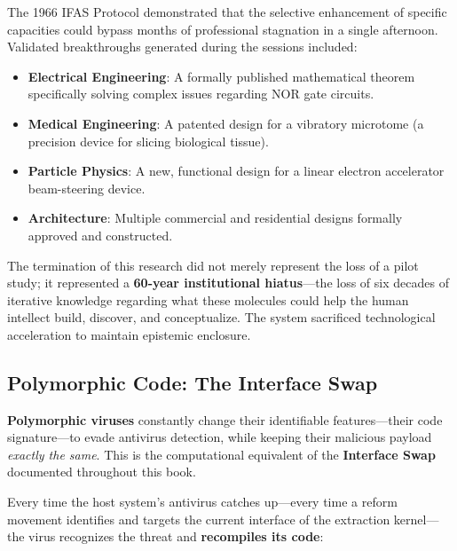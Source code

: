 \documentclass[12pt,openany]{book}
\begin{document}
\begin{historicalsource}
The 1966 IFAS Protocol demonstrated that the selective enhancement of specific capacities could bypass months of professional stagnation in a single afternoon. Validated breakthroughs generated during the sessions included:
\begin{itemize}
    \item \textbf{Electrical Engineering}: A formally published mathematical theorem specifically solving complex issues regarding NOR gate circuits.
    \item \textbf{Medical Engineering}: A patented design for a vibratory microtome (a precision device for slicing biological tissue).
    \item \textbf{Particle Physics}: A new, functional design for a linear electron accelerator beam-steering device.
    \item \textbf{Architecture}: Multiple commercial and residential designs formally approved and constructed.
\end{itemize}
The termination of this research did not merely represent the loss of a pilot study; it represented a \textbf{60-year institutional hiatus}—the loss of six decades of iterative knowledge regarding what these molecules could help the human intellect build, discover, and conceptualize. The system sacrificed technological acceleration to maintain epistemic enclosure.
\end{historicalsource}

\subsection{Polymorphic Code: The Interface Swap}

\textbf{Polymorphic viruses} constantly change their identifiable features---their code signature---to evade antivirus detection, while keeping their malicious payload \textit{exactly the same}. This is the computational equivalent of the \textbf{Interface Swap} documented throughout this book.

Every time the host system's antivirus catches up---every time a reform movement identifies and targets the current interface of the extraction kernel---the virus recognizes the threat and \textbf{recompiles its code}:
\end{document}
